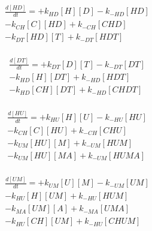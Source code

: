 \begin{equation}
\begin{split}
\frac{d[HD]}{dt} =    + k_{HD}[H][D]    - k_{-HD}[HD]     \\%
                      - k_{CH}[C][HD]   + k_{-CH}[CHD]    \\%
                      - k_{DT}[HD][T]   + k_{-DT}[HDT]    \\%
\end{split}
\end{equation}

\begin{equation}
\begin{split}
\frac{d[DT]}{dt} =    + k_{DT}[D][T]    - k_{-DT}[DT]     \\%
                      - k_{HD}[H][DT]   + k_{-HD}[HDT]    \\%
                      - k_{HD}[CH][DT]  + k_{-HD}[CHDT]   \\%
\end{split}
\end{equation}

\begin{equation}
\begin{split}
\frac{d[HU]}{dt} =    + k_{HU}[H][U]    - k_{-HU}[HU]     \\%
                      - k_{CH}[C][HU]   + k_{-CH}[CHU]    \\%
                      - k_{UM}[HU][M]   + k_{-UM}[HUM]    \\%
                      - k_{UM}[HU][MA]  + k_{-UM}[HUMA]   \\%
\end{split}
\end{equation}

\begin{equation}
\begin{split}
\frac{d[UM]}{dt} =    + k_{UM}[U][M]    - k_{-UM}[UM]     \\%
                      - k_{HU}[H][UM]   + k_{-HU}[HUM]    \\%
                      - k_{MA}[UM][A]   + k_{-MA}[UMA]    \\%
                      - k_{HU}[CH][UM]  + k_{-HU}[CHUM]   \\%
\end{split}
\end{equation}

